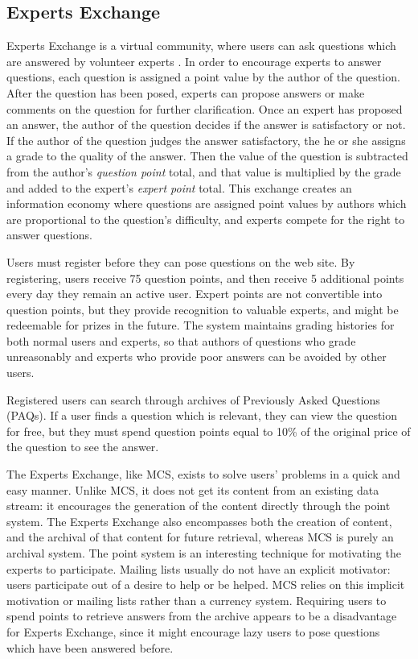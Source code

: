 \subsection{Experts Exchange}
Experts Exchange is a virtual community, where users can ask questions which
are answered by volunteer experts \cite{experts-exchange-website}. In order to
encourage experts to answer questions, each question is assigned a point value
by the author of the question. After the question has been posed, experts can
propose answers or make comments on the question for further clarification.
Once an expert has proposed an answer, the author of the question decides if
the answer is satisfactory or not. If the author of the question judges the
answer satisfactory, the he or she assigns a grade to the quality of the
answer. Then the value of the question is subtracted from the author's {\it
  question point} total, and that value is multiplied by the grade and added to
the expert's {\it expert point} total. This exchange creates an information
economy where questions are assigned point values by authors which are
proportional to the question's difficulty, and experts compete for the right to
answer questions.

Users must register before they can pose questions on the web site. By
registering, users receive 75 question points, and then receive 5 additional
points every day they remain an active user. Expert points are not convertible
into question points, but they provide recognition to valuable experts, and
might be redeemable for prizes in the future. The system maintains grading
histories for both normal users and experts, so that authors of questions who
grade unreasonably and experts who provide poor answers can be avoided by other
users.

Registered users can search through archives of Previously Asked Questions
(PAQs). If a user finds a question which is relevant, they can view the
question for free, but they must spend question points equal to 10\% of the
original price of the question to see the answer.

The Experts Exchange, like MCS, exists to solve users' problems in a quick and
easy manner. Unlike MCS, it does not get its content from an existing data
stream: it encourages the generation of the content directly through the point
system. The Experts Exchange also encompasses both the creation of content, and
the archival of that content for future retrieval, whereas MCS is purely an
archival system. The point system is an interesting technique for motivating
the experts to participate. Mailing lists usually do not have an explicit
motivator: users participate out of a desire to help or be helped. MCS relies
on this implicit motivation or mailing lists rather than a currency system.
Requiring users to spend points to retrieve answers from the archive appears to
be a disadvantage for Experts Exchange, since it might encourage lazy users to
pose questions which have been answered before.

